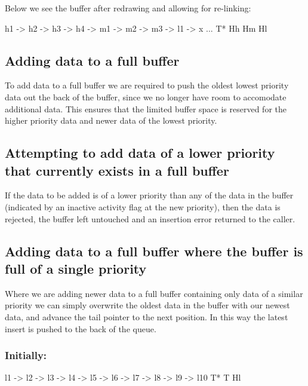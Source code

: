 Below we see the buffer after redrawing and allowing for re-\/linking\+:


\begin{DoxyCode}
h1  ->  h2  ->  h3  ->  h4  ->   m1  ->  m2  ->  m3  ->  l1  ->  x  ...
T*
                        Hh                       Hm      Hl
\end{DoxyCode}


\subsection*{Adding data to a full buffer}

To add data to a full buffer we are required to push the oldest lowest priority data \textquotesingle{}out the back\textquotesingle{} of the buffer, since we no longer have room to accomodate additional data. This ensures that the limited buffer space is reserved for the higher priority data and newer data of the lowest priority.

\subsection*{Attempting to add data of a lower priority that currently exists in a full buffer}

If the data to be added is of a lower priority than any of the data in the buffer (indicated by an inactive activity flag at the new priority), then the data is rejected, the buffer left untouched and an insertion error returned to the caller.

\subsection*{Adding data to a full buffer where the buffer is full of a single priority}

Where we are adding newer data to a full buffer containing only data of a similar priority we can simply overwrite the oldest data in the buffer with our newest data, and advance the tail pointer to the next position. In this way the latest insert is pushed to the back of the queue.

\subsubsection*{Initially\+:}


\begin{DoxyCode}
l1  ->  l2  ->  l3  ->  l4  ->   l5  ->  l6  ->  l7  ->  l8  ->  l9  ->  l10
T*                                                                       T
                                                                         Hl
\end{DoxyCode}



